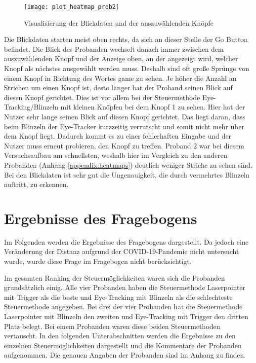 \begin{figure}[!htbp]
	\centering
	\texttt{[image: plot\_heatmap\_prob2]}
	\caption[Visualisierung der Blickdaten und der auszuwählenden Knöpfe] {Visualisierung der Blickdaten und der auszuwählenden Knöpfe}
	\label{fig:plotheatmapprob2}
\end{figure}

Die Blickdaten starten meist oben rechts, da sich an dieser Stelle der Go Button befindet. Die Blick des Probanden wechselt danach immer zwischen dem auszuwählenden Knopf und der Anzeige oben, an der angezeigt wird, welcher Knopf als nächstes ausgewählt werden muss. Deshalb sind oft große Sprünge von einem Knopf in Richtung des Wortes \grqq game \grqq zu sehen. Je höher die Anzahl an Strichen um einen Knopf ist, desto länger hat der Proband seinen Blick auf diesen Knopf gerichtet. Dies ist vor allem bei der Steuermethode Eye-Tracking/Blinzeln mit kleinen Knöpfen bei dem Knopf 1 zu sehen. Hier hat der Nutzer sehr lange seinen Blick auf diesen Knopf gerichtet. Das liegt daran, dass beim Blinzeln der Eye-Tracker kurzzeitig verrutscht und somit nicht mehr über dem Knopf liegt. Dadurch kommt es zu einer fehlerhaften Eingabe und der Nutzer muss erneut probieren, den Knopf zu treffen. Proband 2 war bei diesem Versuchsaufbau am schnellsten, weshalb hier im Vergleich zu den anderen Probanden (Anhang \ref{appendix:heatmaps}) deutlich weniger Striche zu sehen sind. Bei den Blickdaten ist sehr gut die Ungenauigkeit, die durch vermehrtes Blinzeln auftritt, zu erkennen. 

\section{Ergebnisse des Fragebogens}
Im Folgenden werden die Ergebnisse des Fragebogens dargestellt. Da jedoch eine Veränderung der Distanz aufgrund der COVID-19-Pandemie nicht untersucht wurde, wurde diese Frage im Fragebogen nicht berücksichtigt. 

Im gesamten Ranking der Steuermöglichkeiten waren sich die Probanden grundsätzlich einig. Alle vier Probanden haben die Steuermethode Laserpointer mit Trigger als die beste und Eye-Tracking mit Blinzeln als die schlechteste Steuermethode angegeben. Bei drei der vier Probanden hat die Steuermethode Laserpointer mit Blinzeln den zweiten und Eye-Tracking mit Trigger den dritten Platz belegt. Bei einem Probanden waren diese beiden Steuermethoden vertauscht. In den folgenden Unterabschnitten werden die Ergebnisse zu den einzelnen Steuermöglichkeiten dargestellt und die Kommentare der Probanden aufgenommen. Die genauen Angaben der Probanden sind im Anhang  zu finden.
